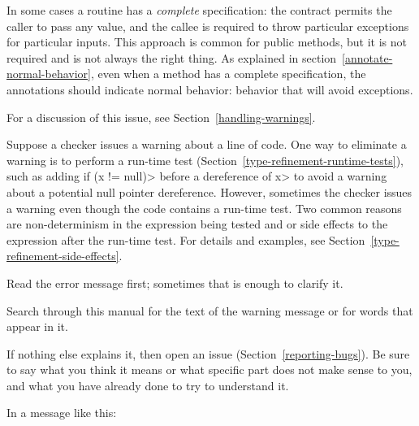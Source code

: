 In some cases a routine has a \emph{complete} specification:  the contract
permits the caller to pass any value, and the callee is required to throw
particular exceptions for particular inputs.  This approach is common for
public methods, but it is not required and is not always the right thing.
As explained in section~\ref{annotate-normal-behavior}, even when a method
has a complete specification, the annotations should indicate normal
behavior:  behavior that will avoid exceptions.





For a discussion of this issue, see Section~\ref{handling-warnings}.



Suppose a checker issues a warning about a line of code.  One way to
eliminate a warning is to perform a run-time test
(Section~\ref{type-refinement-runtime-tests}), such as adding \<if (x !=
null)> before a dereference of \<x> to avoid a warning about a potential
null pointer dereference.  However, sometimes the checker issues a warning
even though the code contains a run-time test.  Two common reasons are
non-determinism in the expression being tested and or side effects to the
expression after the run-time test.  For details and examples, see
Section~\ref{type-refinement-side-effects}.



Read the error message first; sometimes that is enough to clarify it.

Search through this manual for the text of the warning message or for words
that appear in it.

If nothing else explains it, then
open an issue (Section~\ref{reporting-bugs}).
Be sure to say what you think it means or what specific part does
not make sense to you, and what you have already done to try to understand it.



In a message like this:

